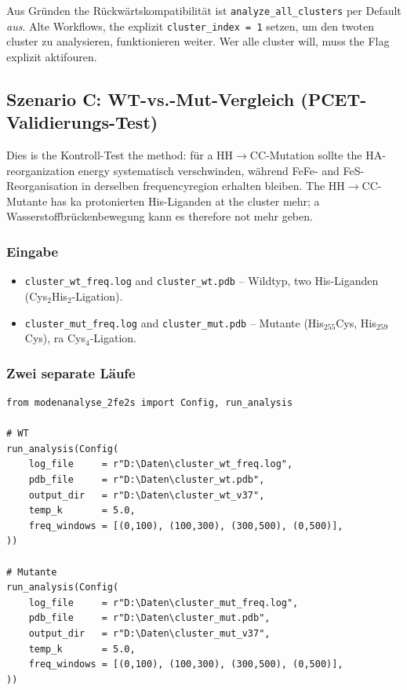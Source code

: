 \documentclass[11pt,a4paper,twoside]{article}
\theoremstyle{remark}
\begin{document}
Aus Gr\"unden the R\"uckw\"artskompatibilit\"at ist
\texttt{analyze\_all\_clusters} per Default \emph{aus}. Alte
Workflows, the explizit \texttt{cluster\_index = 1} setzen, um den
twoten cluster zu analysieren, funktionieren weiter. Wer alle
cluster will, muss the Flag explizit aktifouren.

\subsection{Szenario C: WT-vs.-Mut-Vergleich (PCET-Validierungs-Test)}
\label{sec:workflow-wtmut}

Dies is the Kontroll-Test the method: f\"ur a HH$\to$CC-Mutation
sollte the HA-reorganization energy systematisch verschwinden,
w\"ahrend FeFe- and FeS-Reorganisation in derselben frequencyregion
erhalten bleiben. The HH$\to$CC-Mutante has ka protonierten
His-Liganden at the cluster mehr; a Wasserstoffbr\"uckenbewegung kann
es therefore not mehr geben.

\subsubsection*{Eingabe}

\begin{itemize}
  \item \texttt{cluster\_wt\_freq.log} and \texttt{cluster\_wt.pdb} -- Wildtyp,
        two His-Liganden (Cys$_2$His$_2$-Ligation).
  \item \texttt{cluster\_mut\_freq.log} and \texttt{cluster\_mut.pdb} --
        Mutante (His$_{255}$Cys, His$_{259}$Cys), ra Cys$_4$-Ligation.
\end{itemize}

\subsubsection*{Zwei separate L\"aufe}

\begin{lstlisting}[style=python]
from modenanalyse_2fe2s import Config, run_analysis

# WT
run_analysis(Config(
    log_file     = r"D:\Daten\cluster_wt_freq.log",
    pdb_file     = r"D:\Daten\cluster_wt.pdb",
    output_dir   = r"D:\Daten\cluster_wt_v37",
    temp_k       = 5.0,
    freq_windows = [(0,100), (100,300), (300,500), (0,500)],
))

# Mutante
run_analysis(Config(
    log_file     = r"D:\Daten\cluster_mut_freq.log",
    pdb_file     = r"D:\Daten\cluster_mut.pdb",
    output_dir   = r"D:\Daten\cluster_mut_v37",
    temp_k       = 5.0,
    freq_windows = [(0,100), (100,300), (300,500), (0,500)],
))
\end{lstlisting}
\end{document}
